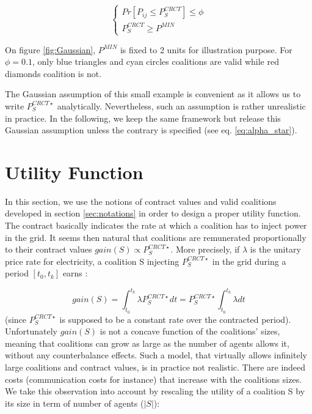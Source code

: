 \documentclass[journal]{IEEEtran}
\begin{document}
\begin{equation}
\left\{ \begin{array}{lll}
			Pr[P_{ij} \leq P_{S}^{CRCT}] \leq \phi \\
			P_{S}^{CRCT} \geq P^{MIN}
\end{array} \right.
\end{equation}

On figure \ref{fig:Gaussian}, $ P^{MIN} $ is fixed to 2 units for illustration purpose. For $ \phi = 0.1 $, only blue triangles and cyan circles coalitions are valid while red diamonds coalition is not.

The Gaussian assumption of this small example is convenient as it allows us to write $ P_{S}^{CRCT \star} $ analytically. Nevertheless, such an assumption is rather unrealistic in practice. In the following, we keep the same framework but release this Gaussian assumption unless the contrary is specified (see eq. \ref{eq:alpha_star}).

%
%

\section{Utility Function}
\label{sec:utility}

In this section, we use the notions of contract values and valid coalitions developed in section \ref{sec:notations} in order to design a proper utility function. The contract basically indicates the rate at which a coalition has to inject power in the grid. It seems then natural that coalitions are remunerated proportionally to their contract values $ gain(S) \propto P_{S}^{CRCT \star} $. More precisely, if $ \lambda $ is the unitary price rate for electricity, a coalition S injecting $ P_{S}^{CRCT \star} $ in the grid during a period $ [t_{0},t_{k}] $ earns :

\begin{equation}
gain(S) = \int_{t_{0}}^{t_{k}} \lambda P_{S}^{CRCT \star} dt = P_{S}^{CRCT \star} \int_{t_{0}}^{t_{k}} \lambda dt
\end{equation} 
(since $ P_{S}^{CRCT \star} $ is supposed to be a constant rate over the contracted period). Unfortunately $ gain(S) $ is not a concave function of the coalitions' sizes, meaning that coalitions can grow as large as the number of agents allows it, without any counterbalance effects. Such a model, that virtually allows infinitely large coalitions and contract values, is in practice not realistic. There are indeed costs (communication costs for instance) that increase with the coalitions sizes. We take this observation into account by rescaling the utility of a coalition S by its size in term of number of agents ($|S|$):
\end{document}
